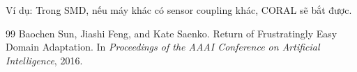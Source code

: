 \documentclass[a4paper]{article}
\begin{document}
Ví dụ: Trong SMD, nếu máy khác có sensor coupling khác, CORAL sẽ bắt được.

\begin{thebibliography}{99}
Baochen Sun, Jiashi Feng, and Kate Saenko.
\newblock Return of Frustratingly Easy Domain Adaptation.
\newblock In \emph{Proceedings of the AAAI Conference on Artificial Intelligence}, 2016.
\end{thebibliography}
\end{document}

